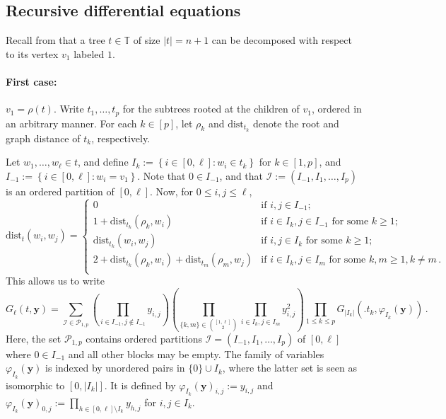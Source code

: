 \documentclass{article}
\theoremstyle{remark}
\newcommand{\bT}{\mathbb{T}}
\newcommand{\abs}[1]{{\left|#1\right|}}
\newcommand{\dist}{\mathrm{dist}}
\newcommand{\cI}{\mathcal{I}}
\newcommand{\cP}{\mathcal{P}}
\newcommand{\by}{{\mathbf{y}}}
\begin{document}
\subsection{Recursive differential equations}
\label{sec: Recursive differential equation}

Recall from  that a tree $t\in\bT$ of size $\abs{t} = n+1$ can be decomposed with respect to its vertex $v_1$ labeled $1$.

\paragraph{First case:}
$v_1=\rho(t)$.
Write $t_1, \dots, t_p$ for the subtrees rooted at the children of $v_1$, ordered in an arbitrary manner.
For each $k\in[p]$, let $\rho_k$ and $\dist_{t_k}$ denote the root and graph distance of $t_k$, respectively.

Let $w_1,\dots,w_\ell \in t$, and define $I_k := \left\{ i\in[0,\ell] : w_i\in t_k \right\}$ for $k\in[1,p]$, and $I_{-1} := \left\{ i\in[0,\ell] : w_i = v_1 \right\}$.
Note that $0\in I_{-1}$, and that $\cI := \left( I_{-1}, I_1, \dots, I_p \right)$ is an ordered partition of $[0,\ell]$.
Now, for $0\le i,j\le \ell$,
\[
\dist_t(w_i,w_j) = 
\left\{
\begin{array}{llll}
    0 & \text{if } i,j\in I_{-1} ;\\
    1 + \dist_{t_k}(\rho_k,w_i) & \text{if } i\in I_k, j\in I_{-1} \text{ for some } k\ge1 ;\\
    \dist_{t_k}(w_i,w_j) & \text{if } i,j\in I_k \text{ for some } k\ge1 ;\\
    2 + \dist_{t_k}(\rho_k,w_i) + \dist_{t_m}(\rho_m,w_j) & \text{if } i\in I_k, j\in I_m \text{ for some } k,m\ge1, k \ne m \,.\\
\end{array}
\right.
\]
This allows us to write
\begin{equation}\label{eq: decomposition G first case}
    G_\ell(t,\by) = \sum_{\cI \in \cP_{1,p}} 
    \left( \prod_{i\in I_{-1}, j\notin I_{-1}} y_{i,j} \right)
    \left( \prod_{\{k,m\} \in \binom{[1,\ell]}{2}} \prod_{i\in I_k, j\in I_m} y_{i,j}^2 \right)
    \prod_{1\le k\le p} G_{\abs{I_k}}\left(\big. t_k , \varphi_{I_k}(\by) \right) \,.
\end{equation}
Here, the set $\cP_{1,p}$ contains ordered partitions $\cI = (I_{-1}, I_1, \dots, I_p)$ of $[0,\ell]$ where $0\in I_{-1}$ and all other blocks may be empty.
The family of variables $\varphi_{I_k}(\by)$ is indexed by unordered pairs in $\{0\} \cup I_k$, where the latter set is seen as isomorphic to $[0,\abs{I_k}]$.
It is defined by $\varphi_{I_k}(\by)_{i,j} := y_{i,j}$ and $\varphi_{I_k}(\by)_{0,j} := \prod_{h\in [0,\ell] \setminus I_k} y_{h,j}$ for $i,j\in I_k$.
\end{document}
